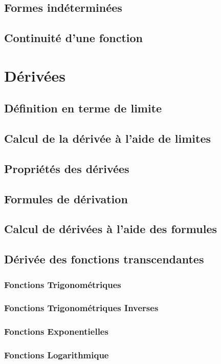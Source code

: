 \documentclass{article}
\begin{document}
\subsection{Formes indéterminées}
\subsection{Continuité d’une fonction}

\section{Dérivées}
\subsection{Définition en terme de limite}
\subsection{Calcul de la dérivée à l’aide de limites}
\subsection{Propriétés des dérivées}
\subsection{Formules de dérivation}
\subsection{Calcul de dérivées à l’aide des formules}
\subsection{Dérivée des fonctions transcendantes}
\subsubsection{Fonctions Trigonométriques}
\subsubsection{Fonctions Trigonométriques Inverses}
\subsubsection{Fonctions Exponentielles}
\subsubsection{Fonctions Logarithmique}
\end{document}
